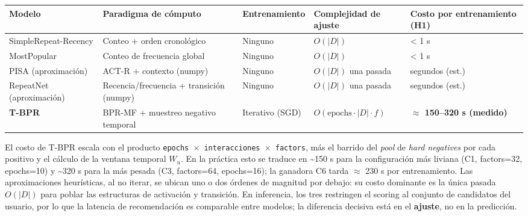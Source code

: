 \documentclass{article}
\begin{document}
{\def\LTcaptype{none} %
\begin{longtable}[]{@{}
  >{\raggedright\arraybackslash}p{}
  >{\raggedright\arraybackslash}p{}
  >{\raggedright\arraybackslash}p{}
  >{\raggedright\arraybackslash}p{}
  >{\raggedleft\arraybackslash}p{}@{}}
\toprule\noalign{}
\begin{minipage}[b]{\linewidth}\raggedright
Modelo
\end{minipage} & \begin{minipage}[b]{\linewidth}\raggedright
Paradigma de cómputo
\end{minipage} & \begin{minipage}[b]{\linewidth}\raggedright
Entrenamiento
\end{minipage} & \begin{minipage}[b]{\linewidth}\raggedright
Complejidad de ajuste
\end{minipage} & \begin{minipage}[b]{\linewidth}\raggedleft
Costo por entrenamiento (H1)
\end{minipage} \\
\midrule\noalign{}
\endhead
\bottomrule\noalign{}
\endlastfoot
SimpleRepeat-Recency & Conteo + orden cronológico & Ninguno & \(O(\lvert D\rvert)\) & \textless{} 1 s \\
MostPopular & Conteo de frecuencia global & Ninguno & \(O(\lvert D\rvert)\) & \textless{} 1 s \\
PISA (aproximación) & ACT-R + contexto (numpy) & Ninguno & \(O(\lvert D\rvert)\) una pasada & segundos (est.) \\
RepeatNet (aproximación) & Recencia/frecuencia + transición (numpy) & Ninguno & \(O(\lvert D\rvert)\) una pasada & segundos (est.) \\
\textbf{T-BPR} & BPR-MF + muestreo negativo temporal & Iterativo (SGD) & \(O(\text{epochs}\cdot\lvert D\rvert\cdot f)\) & \textbf{$\approx$ 150--320 s (medido)} \\
\end{longtable}
}

El costo de T-BPR escala con el producto \texttt{epochs\ $\times$\ \textbar{}interacciones\textbar{}\ $\times$\ factors}, más el barrido del \emph{pool} de \emph{hard negatives} por cada positivo y el cálculo de la ventana temporal \(W_u\). En la práctica esto se traduce en \textasciitilde150 s para la configuración más liviana (C1, factors=32, epochs=10) y \textasciitilde320 s para la más pesada (C3, factors=64, epochs=16); la ganadora C6 tarda $\approx$ 230 s por entrenamiento. Las aproximaciones heurísticas, al no iterar, se ubican uno o dos órdenes de magnitud por debajo: su costo dominante es la única pasada \(O(\lvert D\rvert)\) para poblar las estructuras de activación y transición. En inferencia, los tres restringen el scoring al conjunto de candidatos del usuario, por lo que la latencia de recomendación es comparable entre modelos; la diferencia decisiva está en el \textbf{ajuste}, no en la predicción.
\end{document}
